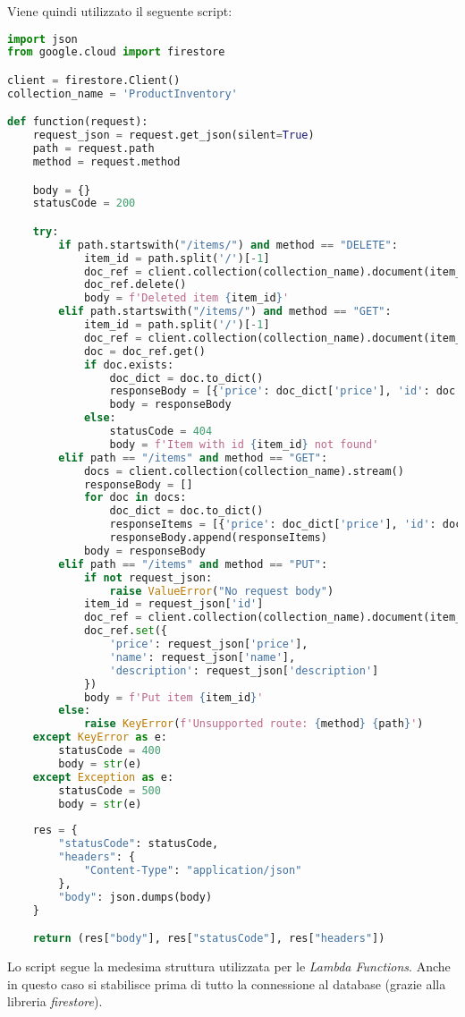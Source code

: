 Viene quindi utilizzato il seguente script:
\begin{lstlisting}[language=python]
import json
from google.cloud import firestore

client = firestore.Client()
collection_name = 'ProductInventory'

def function(request):
    request_json = request.get_json(silent=True)
    path = request.path
    method = request.method

    body = {}
    statusCode = 200

    try:
        if path.startswith("/items/") and method == "DELETE":
            item_id = path.split('/')[-1]
            doc_ref = client.collection(collection_name).document(item_id)
            doc_ref.delete()
            body = f'Deleted item {item_id}'
        elif path.startswith("/items/") and method == "GET":
            item_id = path.split('/')[-1]
            doc_ref = client.collection(collection_name).document(item_id)
            doc = doc_ref.get()
            if doc.exists:
                doc_dict = doc.to_dict()
                responseBody = [{'price': doc_dict['price'], 'id': doc.id, 'name': doc_dict['name'], 'description': doc_dict['description']}]
                body = responseBody
            else:
                statusCode = 404
                body = f'Item with id {item_id} not found'
        elif path == "/items" and method == "GET":
            docs = client.collection(collection_name).stream()
            responseBody = []
            for doc in docs:
                doc_dict = doc.to_dict()
                responseItems = [{'price': doc_dict['price'], 'id': doc.id, 'name': doc_dict['name'], 'description': doc_dict['description']}]
                responseBody.append(responseItems)
            body = responseBody
        elif path == "/items" and method == "PUT":
            if not request_json:
                raise ValueError("No request body")
            item_id = request_json['id']
            doc_ref = client.collection(collection_name).document(item_id)
            doc_ref.set({
                'price': request_json['price'],
                'name': request_json['name'],
                'description': request_json['description']
            })
            body = f'Put item {item_id}'
        else:
            raise KeyError(f'Unsupported route: {method} {path}')
    except KeyError as e:
        statusCode = 400
        body = str(e)
    except Exception as e:
        statusCode = 500
        body = str(e)
    
    res = {
        "statusCode": statusCode,
        "headers": {
            "Content-Type": "application/json"
        },
        "body": json.dumps(body)
    }

    return (res["body"], res["statusCode"], res["headers"])
\end{lstlisting}
Lo script segue la medesima struttura utilizzata per le \textit{Lambda Functions}. Anche in questo caso si stabilisce prima di tutto la connessione al database (grazie alla libreria \textit{firestore}).

